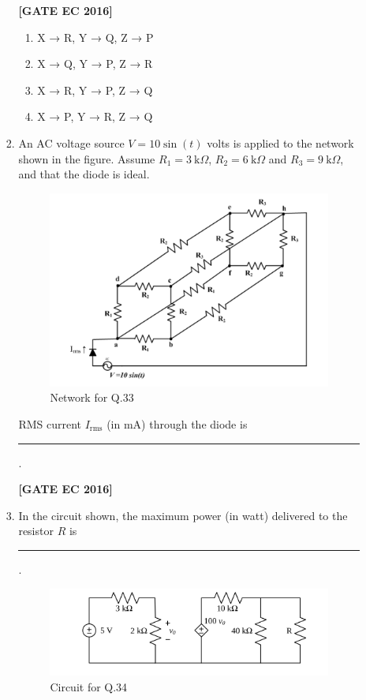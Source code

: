 \documentclass[12pt]{article}
\begin{document}
\begin{enumerate}[label=\textbf{Q.\arabic*.}, start=6, itemsep=2em]
\begin{enumerate}[label=\textbf{Q.\arabic*.}, start=26]
\begin{enumerate}[label=\textbf{Q.\arabic*.}, start=31]
\noindent \textbf{[GATE EC 2016]}

\begin{multicols}{2}
\begin{enumerate}[label=\alph*.]
    \item X → R,\; Y → Q,\; Z → P
    \item X → Q,\; Y → P,\; Z → R
    \item X → R,\; Y → P,\; Z → Q
    \item X → P,\; Y → R,\; Z → Q
\end{enumerate}
\end{multicols}

\item An AC voltage source $V=10\sin(t)$ volts is applied to the network shown in the figure. Assume $R_1=3\ \text{k}\Omega$, $R_2=6\ \text{k}\Omega$ and $R_3=9\ \text{k}\Omega$, and that the diode is ideal.

\begin{figure}[H]\centering
    \includegraphics[width=0.6\columnwidth]{figs/q33.png}
    \caption{Network for Q.33}
    \label{fig:q33}
\end{figure}

RMS current $I_{\text{rms}}$ (in mA) through the diode is \rule{3cm}{0.4pt}.

\noindent \textbf{[GATE EC 2016]}

\item In the circuit shown, the maximum power (in watt) delivered to the resistor $R$ is \rule{3cm}{0.4pt}.

\begin{figure}[H]\centering
    \includegraphics[width=0.6\columnwidth]{figs/q34.png}
    \caption{Circuit for Q.34}
    \label{fig:q34}
\end{figure}


\end{enumerate}
\end{enumerate}
\end{enumerate}
\end{document}
